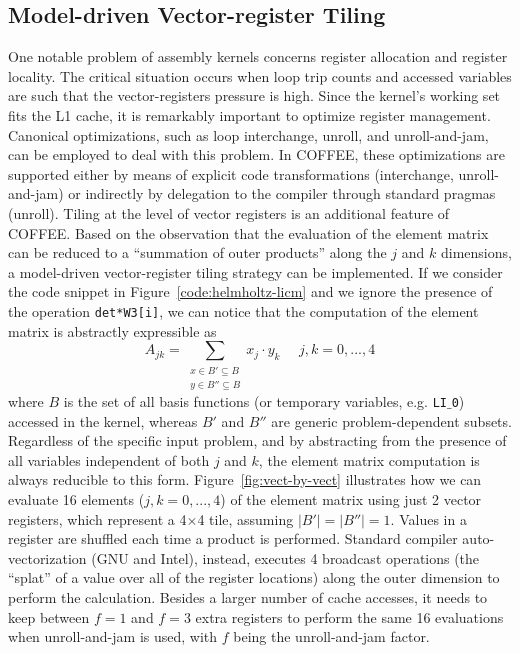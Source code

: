 \documentclass[conference]{IEEEtran}
\begin{document}
\subsection{Model-driven Vector-register Tiling}
One notable problem of assembly kernels concerns register allocation and register locality. The critical situation occurs when loop trip counts and accessed variables are such that the vector-registers pressure is high. Since the kernel's working set fits the L1 cache, it is remarkably important to optimize register management. Canonical optimizations, such as loop interchange, unroll, and unroll-and-jam, can be employed to deal with this problem. In COFFEE, these optimizations are supported either by means of explicit code transformations (interchange, unroll-and-jam) or indirectly by delegation to the compiler through standard pragmas (unroll). Tiling at the level of vector registers is an additional feature of COFFEE. Based on the observation that the evaluation of the element matrix can be reduced to a ``summation of outer products'' along the $j$ and $k$ dimensions, a model-driven vector-register tiling strategy can be implemented. If we consider the code snippet in Figure~\ref{code:helmholtz-licm} and we ignore the presence of the operation \texttt{det*W3[i]}, we can notice that the computation of the element matrix is abstractly expressible as
\begin{equation}
\label{outer-product}
A_{jk} = \sum_{\substack{
  x \in B' \subseteq B \\
  y \in B'' \subseteq B}}
x_j\cdot y_k ~~~~~~ j,k = 0,...,4
\end{equation}
where $B$ is the set of all basis functions (or temporary variables, e.g. \texttt{LI$\_$0}) accessed in the kernel, whereas $B'$ and $B''$ are generic problem-dependent subsets. Regardless of the specific input problem, and by abstracting from the presence of all variables independent of both $j$ and $k$, the element matrix computation is always reducible to this form. Figure~\ref{fig:vect-by-vect} illustrates how we can evaluate 16 elements ($j,k=0,...,4$) of the element matrix using just 2 vector registers, which represent a 4$\times$4 tile, assuming $\vert B' \vert = \vert B'' \vert = 1$. Values in a register are shuffled each time a product is performed. Standard compiler auto-vectorization (GNU and Intel), instead, executes 4 broadcast operations (the ``splat'' of a value over all of the register locations) along the outer dimension to perform the calculation. Besides a larger number of cache accesses, it needs to keep between $f=1$ and $f=3$ extra registers to perform the same 16 evaluations when unroll-and-jam is used, with $f$ being the unroll-and-jam factor.
\end{document}
